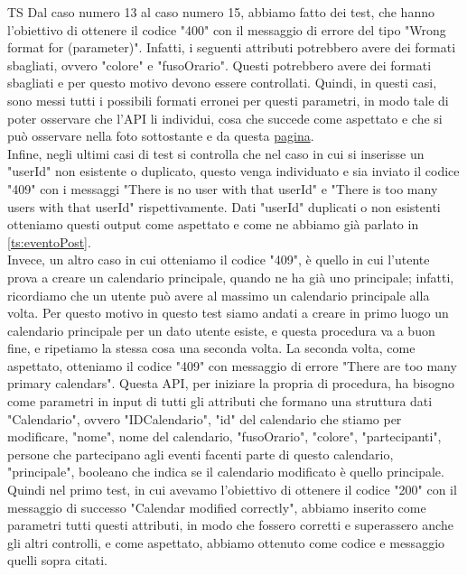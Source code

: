 \begin{listaPersonale}{TS}
                Dal caso numero 13 al caso numero 15, abbiamo fatto dei test, che hanno l'obiettivo di ottenere il codice "400" con il messaggio di errore del tipo "Wrong format for (parameter)". Infatti, i seguenti attributi potrebbero avere dei formati sbagliati, ovvero "colore" e "fusoOrario". Questi potrebbero avere dei formati sbagliati e per questo motivo devono essere controllati. Quindi, in questi casi, sono messi tutti i possibili formati erronei per questi parametri, in modo tale di poter osservare che l'API li individui, cosa che succede come aspettato e che si può osservare nella foto sottostante e da questa \href{https://plan-it.it/test-report.html} {pagina}. \\
                Infine, negli ultimi casi di test si controlla che nel caso in cui si inserisse un "userId" non esistente o duplicato, questo venga individuato e sia inviato il codice "409" con i messaggi "There is no user with that userId" e "There is too many users with that userId" rispettivamente. Dati "userId" duplicati o non esistenti otteniamo questi output come aspettato e come ne abbiamo già parlato in \ref{ts:eventoPost}. \\
                Invece, un altro caso in cui otteniamo il codice "409", è quello in cui l'utente prova a creare un calendario principale, quando ne ha già uno principale; infatti, ricordiamo che un utente può avere al massimo un calendario principale alla volta. Per questo motivo in questo test siamo andati a creare in primo luogo un calendario principale per un dato utente esiste, e questa procedura va a buon fine, e ripetiamo la stessa cosa una seconda volta. La seconda volta, come aspettato, otteniamo il codice "409" con messaggio di errore "There are too many primary calendars".
                Questa API, per iniziare la propria di procedura, ha bisogno come parametri in input di tutti gli attributi che formano una struttura dati "Calendario", ovvero "IDCalendario", "id" del calendario che stiamo per modificare, "nome", nome del calendario, "fusoOrario", "colore", "partecipanti", persone che partecipano agli eventi facenti parte di questo calendario, "principale", booleano che indica se il calendario modificato è quello principale. Quindi nel primo test, in cui avevamo l'obiettivo di ottenere il codice "200" con il messaggio di successo "Calendar modified correctly", abbiamo inserito come parametri tutti questi attributi, in modo che fossero corretti e superassero anche gli altri controlli, e come aspettato, abbiamo ottenuto come codice e messaggio quelli sopra citati.  \\

\end{listaPersonale}
